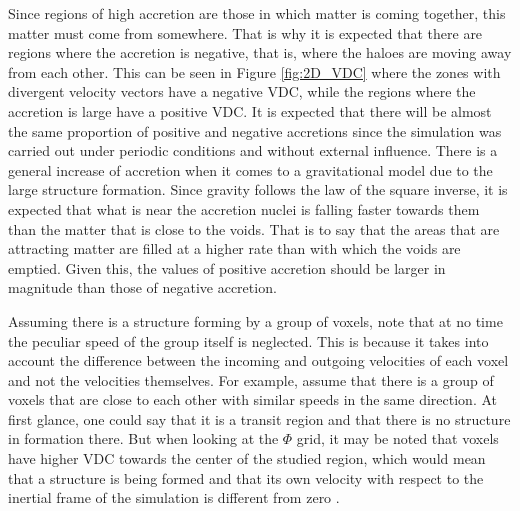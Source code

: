 \documentclass[a4paper,fleqn,usenatbib]{mnras}
\begin{document}

Since regions of high accretion are those in which matter is coming together, this matter must come from somewhere. That is why it is expected that there are regions where the accretion is negative, that is, where the haloes are moving away from each other. This can be seen in Figure \ref{fig:2D_VDC} where the zones with divergent velocity vectors have a negative VDC, while the regions where the accretion is large have a positive VDC.
It is expected that there will be almost the same proportion of positive and negative accretions since the simulation was carried out under periodic conditions and without external influence. There is a general increase of accretion when it comes to a gravitational model due to the large structure formation. Since gravity follows the law of the square inverse, it is expected that what is near the accretion nuclei is falling faster towards them than the matter that is close to the voids. That is to say that the areas that are attracting matter are filled at a higher rate than with which the voids are emptied. Given this, the values of positive accretion should be larger in magnitude than those of negative accretion.


Assuming there is a structure forming by a group of voxels, note that at no time the peculiar speed of the group itself is neglected. This is because it takes into account the difference between the incoming and outgoing velocities of each voxel and not the velocities themselves. For example, assume that there is a group of voxels that are close to each other with similar speeds in the same direction. At first glance, one could say that it is a transit region and that there is no structure in formation there. But when looking at the $\Phi$ grid, it may be noted that voxels have higher VDC towards the center of the studied region, which would mean that a structure is being formed and that its own velocity with respect to the inertial frame of the simulation is different from zero .
\end{document}
